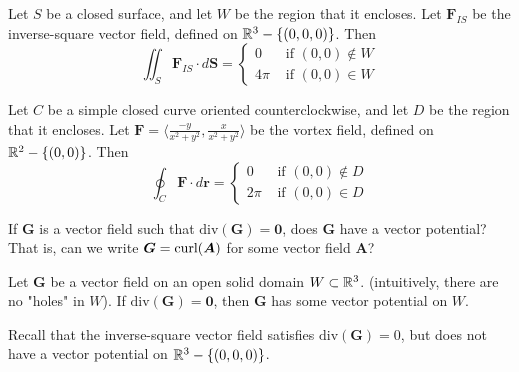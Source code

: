 \begin{theorem}
    Let $S$ be a closed surface, and let $W$ be the region that it encloses.  Let $\bm{F}_{IS}$ be the inverse-square vector field, defined on $\mathbb{R}^3 - \{(0,0,0)\}$.  Then
    $$\iint_S \bm{F}_{IS} \cdot d\bm{S} = \left\{
		\begin{array}{ll}
			0 & \text{ if } (0,0) \notin W \\
			4\pi & \text{ if } (0,0) \in W
		\end{array}
		\right.$$

    \end{theorem}

\begin{theorem}
    Let $C$ be a simple closed curve oriented counterclockwise, and let $D$ be the region that it encloses.  Let $\bm{F} = \langle \frac{-y}{x^2 + y^2}, \frac{x}{x^2 + y^2} \rangle$ be the vortex field, defined on $\mathbb{R}^2 - \{(0,0)\}$.  Then
    $$\oint_C \bm{F} \cdot d\bm{r} = \left\{
		\begin{array}{ll}
			0 & \text{ if } (0,0) \notin D \\
			2\pi & \text{ if } (0,0) \in D
		\end{array}
		\right.$$

    \end{theorem}

\begin{motivating}
    If $\bm{G}$ is a vector field such that $\text{div}(\bm{G}) = \bm{0}$, does $\bm{G}$ have a vector potential?
    That is, can we write $\bm{G} = \textnormal{curl}(\bm{A})$ for some vector field $\bm{A}$?
    \end{motivating}
    
    \begin{theorem}
    Let $\bm{G}$ be a vector field on an open solid domain $W \subset \mathbb{R}^3$.  (intuitively, there are no "holes" in $W$). If $\text{div}(\bm{G}) = \bm{0}$, then $\bm{G}$ has some vector potential on $W$.
    \end{theorem}
    
    \begin{remark}
    Recall that the inverse-square vector field satisfies $\text{div}(\bm{G}) = 0$, but does not have a vector potential on $\mathbb{R}^3-\{(0,0,0)\}$.
    \end{remark}








